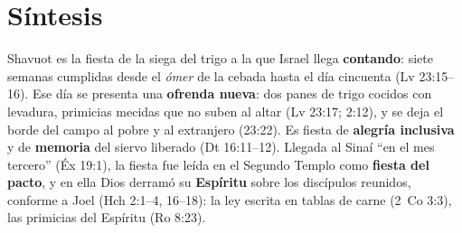 \documentclass[11pt,letterpaper]{article}
\newcommand{\destacar}[1]{\textbf{\textcolor{tierraroja}{#1}}}
\begin{document}
\section{Síntesis}

\begin{tcolorbox}[enhanced,unbreakable,colback=papiro,colframe=tierraroja,boxrule=1pt,arc=3pt,fonttitle=\bfseries,coltitle=papiro,colbacktitle=tierraroja,title={Shavuot: definición}]
Shavuot es la fiesta de la siega del trigo a la que Israel llega \destacar{contando}: siete semanas cumplidas desde el \emph{ómer} de la cebada hasta el día cincuenta (Lv 23:15--16). Ese día se presenta una \destacar{ofrenda nueva}: dos panes de trigo cocidos con levadura, primicias mecidas que no suben al altar (Lv 23:17; 2:12), y se deja el borde del campo al pobre y al extranjero (23:22). Es fiesta de \destacar{alegría inclusiva} y de \destacar{memoria} del siervo liberado (Dt 16:11--12). Llegada al Sinaí ``en el mes tercero'' (Éx 19:1), la fiesta fue leída en el Segundo Templo como \destacar{fiesta del pacto}, y en ella Dios derramó su \destacar{Espíritu} sobre los discípulos reunidos, conforme a Joel (Hch 2:1--4, 16--18): la ley escrita en tablas de carne (2~Co 3:3), las primicias del Espíritu (Ro 8:23).
\end{tcolorbox}
\end{document}
